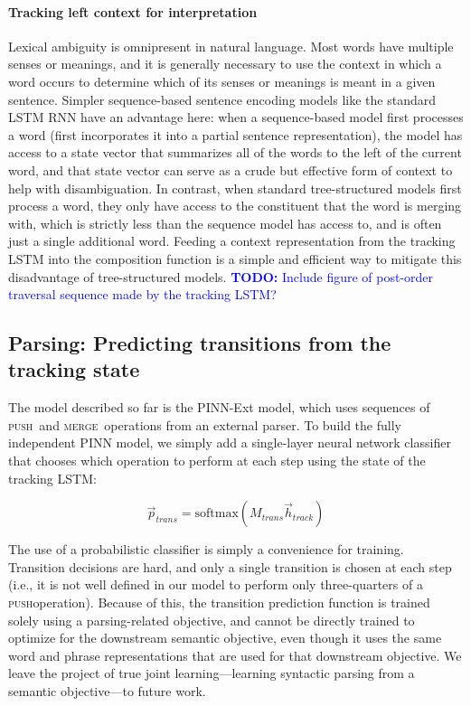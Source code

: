 \documentclass[11pt,letterpaper]{article}
\newcommand\todo[1]{\textcolor{blue}{\textbf{TODO:} #1}}
\newcommand{\shift}{\textsc{push}}
\newcommand{\reduce}{\textsc{merge}}
\begin{document}
\paragraph{Tracking left context for interpretation} Lexical ambiguity is omnipresent in natural language. Most words have multiple senses or meanings, and it is generally necessary to use the context in which a word occurs to determine which of its senses or meanings is meant in a given sentence. Simpler sequence-based sentence encoding models like the standard LSTM RNN have an advantage here: when a sequence-based model first processes a word (first incorporates it into a partial sentence representation), the model has access to a state vector that summarizes all of the words to the left of the current word, and that state vector can serve as a crude but effective form of context to help with disambiguation. In contrast, when standard tree-structured models first process a word, they only have access to the constituent that the word is merging with, which is strictly less than the sequence model has access to, and is often just a single additional word. Feeding a context representation from the tracking LSTM into the composition function is a simple and efficient way to mitigate this disadvantage of tree-structured models.
\todo{Include figure of post-order traversal sequence made by the tracking LSTM?}

\subsection{Parsing: Predicting transitions from the tracking state}

The model described so far is the PINN-Ext model, which uses sequences of \shift~and \reduce~operations from an external parser. To build the fully independent PINN model, we simply add a single-layer neural network classifier that chooses which operation to perform at each step using the state of the tracking LSTM:

\begin{equation}
\vec{p}_{trans} = \text{softmax}(M_{trans}\vec{h}_{track})
\end{equation}

The use of a probabilistic classifier is simply a convenience for training. Transition decisions are hard, and only a single transition is chosen at each step (i.e., it is not well defined in our model to perform only three-quarters of a \shift operation). Because of this, the transition prediction function is trained solely using a parsing-related objective, and cannot be directly trained to optimize for the downstream semantic objective, even though it uses the same word and phrase representations that are used for that downstream objective. We leave the project of true joint learning---learning syntactic parsing from a semantic objective---to future work.
\end{document}
